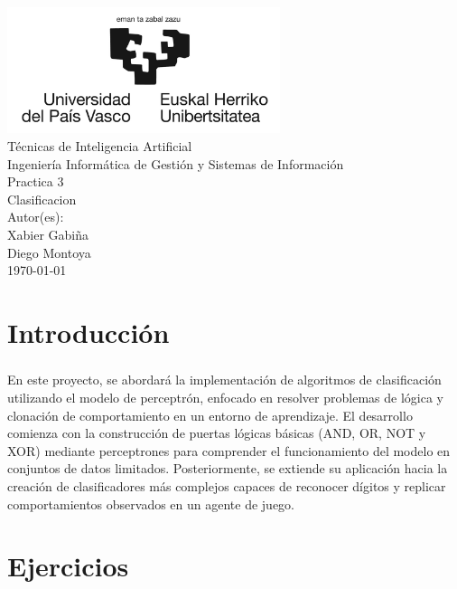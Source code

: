 \documentclass{report}
\begin{document}
  \begin{titlepage}
      \centering
      \includegraphics[width=0.6\textwidth]{./.img/logo.jpg}\\
      \vspace{1cm}
      \LARGE Técnicas de Inteligencia Artificial\\
      \vspace{0.5cm}
      \Large Ingeniería Informática de Gestión y Sistemas de Información\\
      \vspace{3cm}
      \Huge Practica 3\\
      \huge Clasificacion\\
      \vspace{2.5cm}
      \Large Autor(es):\\
      \vspace{0.2cm}
      \large Xabier Gabiña\\
      \large Diego Montoya\\
      \vfill
      \today
  \end{titlepage}
  \tableofcontents
  \lstlistoflistings
  \chapter{Introducción}
    \paragraph*{}{
      En este proyecto, se abordará la implementación de algoritmos de clasificación utilizando el modelo de perceptrón, enfocado en resolver problemas de lógica y clonación de comportamiento en un entorno de aprendizaje. El desarrollo comienza con la construcción de puertas lógicas básicas (AND, OR, NOT y XOR) mediante perceptrones para comprender el funcionamiento del modelo en conjuntos de datos limitados. Posteriormente, se extiende su aplicación hacia la creación de clasificadores más complejos capaces de reconocer dígitos y replicar comportamientos observados en un agente de juego.
    }
  \chapter{Ejercicios}
\end{document}
